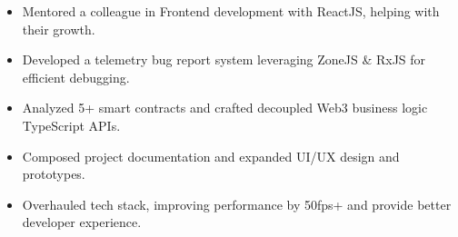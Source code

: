 \documentclass[a4paper,10pt]{article}
\newenvironment{achievementList}{
    \begin{itemize}[
        leftmargin=1em,
        itemindent=0mm,
        itemsep=2.5pt,
        topsep=0.2em,
        parsep=0mm,
    ]
    \sloppy
    \hyphenpenalty=1000
    \exhyphenpenalty=1000
    \setlength{\rightskip}{0mm plus 20em}
    \spaceskip=0.22em
}{
    \end{itemize}
}
\begin{document}
\begin{achievementList}
    \item Mentored a colleague in Frontend development with ReactJS, helping with their growth.

    \item Developed a telemetry bug report system leveraging ZoneJS \& RxJS for efficient debugging.

    \item Analyzed 5+ smart contracts and crafted decoupled Web3 business logic TypeScript APIs.

    \item Composed project documentation and expanded UI/UX design and prototypes.

    \item Overhauled tech stack, improving performance by 50fps+ and provide better developer experience.

\end{achievementList}
\end{document}

